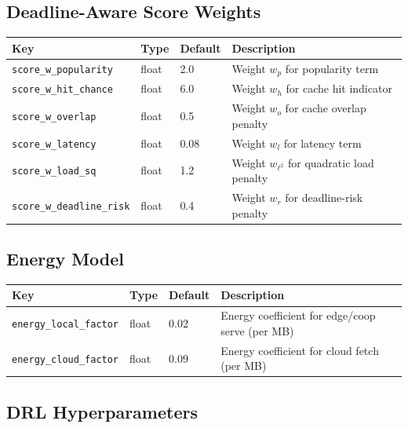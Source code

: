 \documentclass[12pt]{article}
\begin{document}
\subsection{Deadline-Aware Score Weights}

\begin{tabularx}{\linewidth}{@{}l l l X@{}}
\toprule
\textbf{Key} & \textbf{Type} & \textbf{Default} & \textbf{Description} \\
\midrule
\texttt{score\_w\_popularity} & float & 2.0 & Weight $w_p$ for popularity term \\
\texttt{score\_w\_hit\_chance} & float & 6.0 & Weight $w_h$ for cache hit indicator \\
\texttt{score\_w\_overlap} & float & 0.5 & Weight $w_o$ for cache overlap penalty \\
\texttt{score\_w\_latency} & float & 0.08 & Weight $w_l$ for latency term \\
\texttt{score\_w\_load\_sq} & float & 1.2 & Weight $w_{\ell^2}$ for quadratic load penalty \\
\texttt{score\_w\_deadline\_risk} & float & 0.4 & Weight $w_r$ for deadline-risk penalty \\
\bottomrule
\end{tabularx}

\subsection{Energy Model}

\begin{tabularx}{\linewidth}{@{}l l l X@{}}
\toprule
\textbf{Key} & \textbf{Type} & \textbf{Default} & \textbf{Description} \\
\midrule
\texttt{energy\_local\_factor} & float & 0.02 & Energy coefficient for edge/coop serve (per MB) \\
\texttt{energy\_cloud\_factor} & float & 0.09 & Energy coefficient for cloud fetch (per MB) \\
\bottomrule
\end{tabularx}

\subsection{DRL Hyperparameters}
\end{document}
